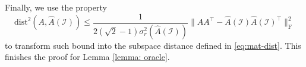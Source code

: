 \documentclass[11pt]{article}
\newcommand{\ha}{\widehat{A}}
\newcommand{\cI}{{\mathcal{I}}}
\newcommand{\0}{{\mathbf{0}}}
\begin{document}
 \par Finally, we use the property \begin{equation*}
    \mathrm{dist}^2(A,\ha(\cI))\leq \frac{1}{2(\sqrt{2}-1)\sigma_r^2(\ha(\cI))}\|AA^\top  -\ha(\cI)\ha(\cI)^\top  \|_\mathrm{F}^2
\end{equation*}
to transform such bound into the subspace distance defined in \eqref{eq:mat-dist}. This finishes the proof for Lemma \ref{lemma: oracle}.\fi
\end{document}
